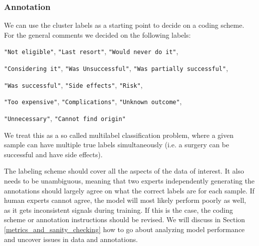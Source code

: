 \subsubsection*{Annotation}
We can use the cluster labels as a starting point to decide on a coding scheme. For the general comments we decided on the following labels:
\begin{displayquote}
    \texttt{"Not eligible"},
    \texttt{"Last resort"},
    \texttt{"Would never do it"},

    \texttt{"Considering it"},
    \texttt{"Was Unsuccessful"},
    \texttt{"Was partially successful"},

    \texttt{"Was successful"},
    \texttt{"Side effects"},
    \texttt{"Risk"},

    \texttt{"Too expensive"},
    \texttt{"Complications"},
    \texttt{"Unknown outcome"},

    \texttt{"Unnecessary"},
    \texttt{"Cannot find origin"}
\end{displayquote}
We treat this as a so called multilabel classification problem, where a given sample can have multiple true labels simultaneously (i.e. a surgery can be successful and have side effects).

The labeling scheme should cover all the aspects of the data of interest.
It also needs to be unambiguous, meaning that two experts independently generating the annotations should largely agree on what the correct labels are for each sample.
If human experts cannot agree, the model will most likely perform poorly as well, as it gets inconsistent signals during training.
If this is the case, the coding scheme or annotation instructions should be revised.
We will discuss in Section \ref{metrics_and_sanity_checking} how to go about analyzing model performance and uncover issues in data and annotations.



